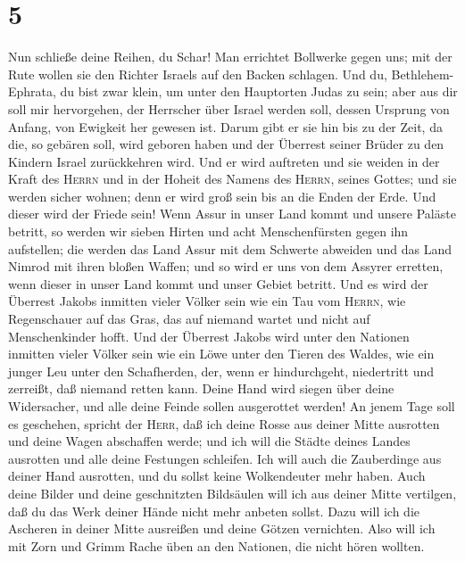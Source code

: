 \hypertarget{section-4}{%
\section{5}\label{section-4}}

 Nun schließe deine Reihen, du Schar! Man errichtet
Bollwerke gegen uns; mit der Rute wollen sie den Richter Israels auf den
Backen schlagen.  Und du, Bethlehem-Ephrata, du bist zwar
klein, um unter den Hauptorten Judas zu sein; aber aus dir soll mir
hervorgehen, der Herrscher über Israel werden soll, dessen Ursprung von
Anfang, von Ewigkeit her gewesen ist.  Darum gibt er sie
hin bis zu der Zeit, da die, so gebären soll, wird geboren haben und der
Überrest seiner Brüder zu den Kindern Israel zurückkehren wird.
 Und er wird auftreten und sie weiden in der Kraft des
\textsc{Herrn} und in der Hoheit des Namens des \textsc{Herrn}, seines
Gottes; und sie werden sicher wohnen; denn er wird groß sein bis an die
Enden der Erde.  Und dieser wird der Friede sein! Wenn
Assur in unser Land kommt und unsere Paläste betritt, so werden wir
sieben Hirten und acht Menschenfürsten gegen ihn aufstellen;
 die werden das Land Assur mit dem Schwerte abweiden und
das Land Nimrod mit ihren bloßen Waffen; und so wird er uns von dem
Assyrer erretten, wenn dieser in unser Land kommt und unser Gebiet
betritt.  Und es wird der Überrest Jakobs inmitten vieler
Völker sein wie ein Tau vom \textsc{Herrn}, wie Regenschauer auf das
Gras, das auf niemand wartet und nicht auf Menschenkinder hofft.
 Und der Überrest Jakobs wird unter den Nationen inmitten
vieler Völker sein wie ein Löwe unter den Tieren des Waldes, wie ein
junger Leu unter den Schafherden, der, wenn er hindurchgeht, niedertritt
und zerreißt, daß niemand retten kann.  Deine Hand wird
siegen über deine Widersacher, und alle deine Feinde sollen ausgerottet
werden!  An jenem Tage soll es geschehen, spricht der
\textsc{Herr}, daß ich deine Rosse aus deiner Mitte ausrotten und deine
Wagen abschaffen werde;  und ich will die Städte deines
Landes ausrotten und alle deine Festungen schleifen.  Ich
will auch die Zauberdinge aus deiner Hand ausrotten, und du sollst keine
Wolkendeuter mehr haben.  Auch deine Bilder und deine
geschnitzten Bildsäulen will ich aus deiner Mitte vertilgen, daß du das
Werk deiner Hände nicht mehr anbeten sollst.  Dazu will
ich die Ascheren in deiner Mitte ausreißen und deine Götzen vernichten.
 Also will ich mit Zorn und Grimm Rache üben an den
Nationen, die nicht hören wollten.

